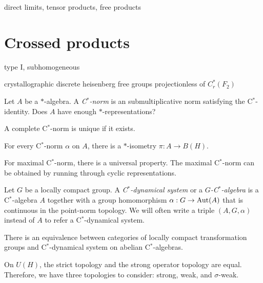 \documentclass{../../large}
\begin{document}
direct limits, tensor products, free products


\section{Crossed products}


\begin{prb}
\end{prb}



type I, subhomogeneous


crystallographic
discrete heisenberg
free groups
projectionless of $C_r^*(F_2)$



\begin{prb}
Let $A$ be a $*$-algebra.
A \emph{C$^*$-norm} is an submultiplicative norm satisfying the C$^*$-identity.
Does $A$ have enough $*$-representations?
\begin{parts}
\item A complete C$^*$-norm is unique if it exists.
\item For every C$^*$-norm $\alpha$ on $A$, there is a $*$-isometry $\pi:A\to B(H)$.
\item For maximal C$^*$-norm, there is a universal property. The maximal C$^*$-norm can be obtained by running through cyclic representations.
\end{parts}
\end{prb}




\begin{prb}
Let $G$ be a locally compact group.
A \emph{C$^*$-dynamical system} or a \emph{$G$-C$^*$-algebra} is a C$^*$-algebra $A$ together with a group homomorphism $\alpha:G\to\operatorname{Aut}(A)$ that is continuous in the point-norm topology.
We will often write a triple $(A,G,\alpha)$ instead of $A$ to refer a C$^*$-dynamical system.
\begin{parts}
\item There is an equivalence between categories of locally compact transformation groups and C$^*$-dynamical system on abelian C$^*$-algebras.
\end{parts}
\end{prb}


On $U(H)$, the strict topology and the strong operator topology are equal.
Therefore, we have three topologies to consider: strong, weak, and $\sigma$-weak.
\end{document}
